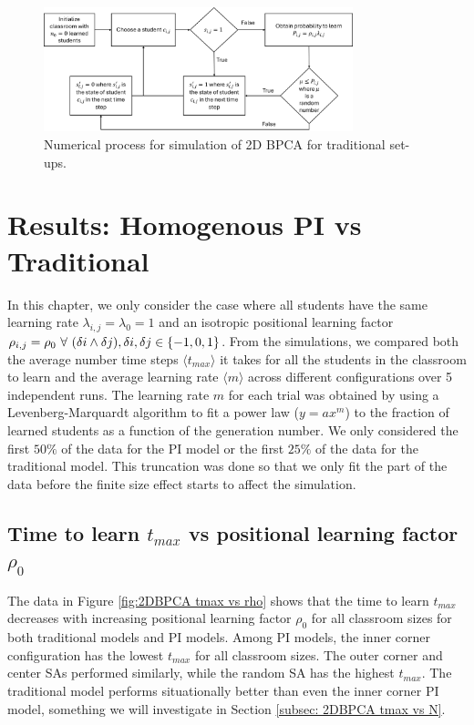 \begin{figure}[htbp!]
    \centering
    \includegraphics[width=0.8\textwidth]{figures/2DBPCA TI Flowchart.png}
    \caption[Traditional instruction flowchart]{Numerical process for simulation of 2D BPCA for traditional set-ups.}
    \label{fig:2DBPCA Traditional Flowchart}
\end{figure}

\section{Results: Homogenous PI vs Traditional}
In this chapter, we only consider the case where all students have the same learning rate $\lambda_{i,j} = \lambda_0 = 1$ and an isotropic positional learning factor $\rho_{i,j} = \rho_0 \space ~\forall~ (\delta i \land \delta j),  \delta i, \delta j \in \lbrace -1,0,1 \rbrace $. From the simulations, we compared both the average number time steps $\langle t_{max} \rangle$ it takes for all the students in the classroom to learn and the average learning rate $\langle m \rangle$ across different configurations over 5 independent runs. The learning rate $m$ for each trial was obtained by using a Levenberg-Marquardt algorithm to fit a power law ($y = ax^m$) to the fraction of learned students as a function of the generation number. We only considered the first $50\%$ of the data for the PI model or the first $25\%$ of the data for the traditional model. This truncation was done so that we only fit the part of the data before the finite size effect starts to affect the simulation.

\subsection{Time to learn $t_{max}$ vs positional learning factor $\rho_0$} \label{subsec: 2DBPCA tmax vs rho}

The data in Figure \ref{fig:2DBPCA tmax vs rho} shows that the time to learn $t_{max}$ decreases with increasing positional learning factor $\rho_0$ for all classroom sizes for both traditional models and PI models. Among PI models, the inner corner configuration has the lowest $t_{max}$ for all classroom sizes. The outer corner and center SAs performed similarly, while the random SA has the highest $t_{max}$. The traditional model performs situationally better than even the inner corner PI model, something we will investigate in Section \ref{subsec: 2DBPCA tmax vs N}.

